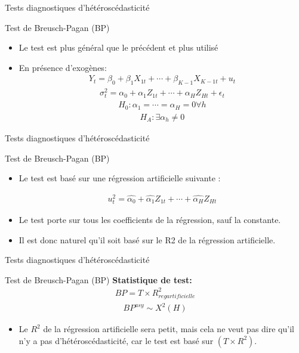\documentclass{beamer}
\begin{document}
\begin{frame}{Tests diagnostiques d'hétéroscédasticité}
\begin{block}{Test de Breusch-Pagan (BP)}
\begin{itemize}
\item Le test est plus général que le précédent et plus utilisé
\item En présence d'exogènes:
\begin{align*}
Y_t=\beta_0+\beta_1 X_{1t}+ \cdots+\beta_{K-1} X_{K-1t}+u_t
\end{align*}
\begin{align*}
\sigma_t^2=\alpha_0+\alpha_1 Z_{1t}+\cdots+\alpha_H Z_{Ht}+\epsilon_t
\end{align*}
\begin{align*}
H_0: \alpha_1=\cdots=\alpha_H=0 \forall h
\end{align*}
\begin{align*}
H_A: \exists \alpha_h \neq 0
\end{align*}
\end{itemize}
\end{block}
\end{frame}

\begin{frame}{Tests diagnostiques d'hétéroscédasticité}
\begin{block}{Test de Breusch-Pagan (BP)}
\begin{itemize}
\item Le test est basé sur une régression artificielle suivante :

\begin{align*}
u_t^2=\hat{\alpha_0}+\hat{\alpha_1} Z_{1t}+\cdots+\hat{\alpha_H} Z_{Ht}
\end{align*}
\item Le test porte sur tous les coefficients de la régression, sauf la constante. 
\item Il est donc naturel qu’il soit basé sur le R2 de la régression artificielle.
\end{itemize}
\end{block}
\end{frame}


\begin{frame}{Tests diagnostiques d'hétéroscédasticité}
\begin{block}{Test de Breusch-Pagan (BP)}
\textbf{Statistique de test:}
\begin{align*}
BP=T \times R_{reg artificielle}^2 
\end{align*}
\begin{align*}
BP^{asy} \sim X^{2}(H)
\end{align*}
\begin{itemize}
\item Le $R^2$ de la régression artificielle sera petit, mais cela ne veut pas dire qu’il n’y a pas d’hétéroscédasticité, car le test est basé sur $(T \times R^2)$.
\end{itemize}
\end{block}
\end{frame}
\end{document}

